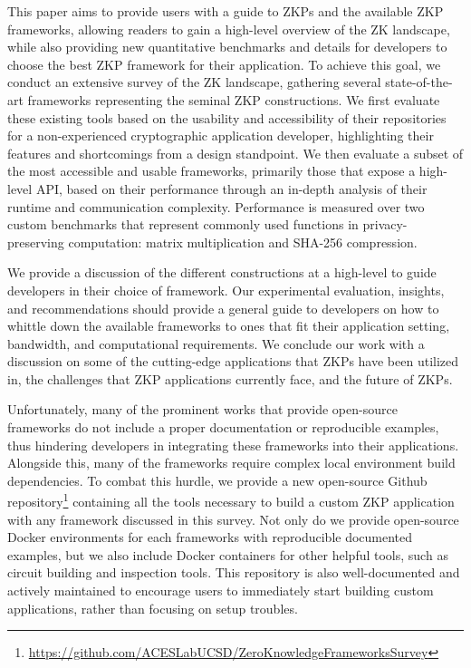 This paper aims to provide users with a guide to ZKPs and the available ZKP frameworks, allowing readers to gain a high-level overview of the ZK landscape, while also providing new quantitative benchmarks and details for developers to choose the best ZKP framework for their application. To achieve this goal, we conduct an extensive survey of the ZK landscape, gathering several state-of-the-art frameworks representing the seminal ZKP constructions. We first evaluate these existing tools based on the usability and accessibility of their repositories for a non-experienced cryptographic application developer, highlighting their features and shortcomings from a design standpoint. 
We then evaluate a subset of the most accessible and usable frameworks, primarily those that expose a high-level API, based on their performance through an in-depth analysis of their runtime and communication complexity. Performance is measured over two custom benchmarks that represent commonly used functions in privacy-preserving computation: matrix multiplication and SHA-256 compression. 

We provide a discussion of the different constructions at a high-level to guide developers in their choice of framework. Our experimental evaluation, insights, and recommendations should provide a general guide to developers on how to whittle down the available frameworks to ones that fit their application setting, bandwidth, and computational requirements.
We conclude our work with a discussion on some of the cutting-edge applications that ZKPs have been utilized in, the challenges that ZKP applications currently face, and the future of ZKPs.

Unfortunately, many of the prominent works that provide open-source frameworks do not include a proper documentation or reproducible examples, thus hindering developers in integrating these frameworks into their applications. Alongside this, many of the frameworks require complex local environment build dependencies. To combat this hurdle, we provide a new open-source Github repository\footnote{\url{https://github.com/ACESLabUCSD/ZeroKnowledgeFrameworksSurvey}} containing all the tools necessary to build a custom ZKP application with any framework discussed in this survey. Not only do we provide open-source Docker environments for each frameworks with reproducible documented examples, but we also include Docker containers for other helpful tools, such as circuit building and inspection tools. This repository is also well-documented and actively maintained to encourage users to immediately start building custom applications, rather than focusing on setup troubles.

